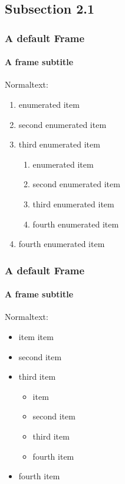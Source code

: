 \documentclass[german,aspectratio=169,notoc,titlestyle=tud,draft]{tudbeamer}%
\begin{document}
\subsection{Subsection 2.1}
\begin{frame}
	\frametitle{A default Frame}
	\framesubtitle{A frame subtitle}

	Normaltext:
	\begin{enumerate}
		\item enumerated item
		\item second enumerated item
		\item third enumerated item
		\begin{enumerate}
			\item enumerated item
			\item second enumerated item
			\item third enumerated item
			\item fourth enumerated item
		\end{enumerate}
		\item fourth enumerated item
	\end{enumerate}
\end{frame}
\begin{frame}
	\frametitle{A default Frame}
	\framesubtitle{A frame subtitle}
	Normaltext:
	\begin{itemize}
		\item item item
		\item second  item
		\item third  item
		\begin{itemize}
			\item  item
			\item second  item
			\item third  item
			\item fourth  item
		\end{itemize}
		\item fourth  item
	\end{itemize}

\end{frame}
\end{document}
